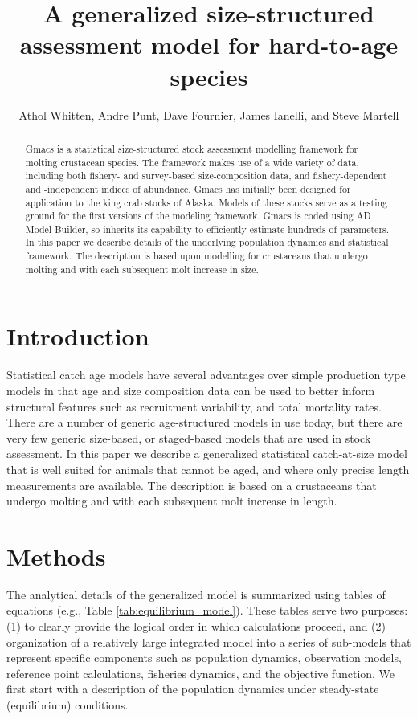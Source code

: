 \documentclass[12pt,letterpaper]{article}
\title{A generalized size-structured assessment model for hard-to-age species}
\author{Athol Whitten, Andre Punt, Dave Fournier, James Ianelli, and Steve Martell}
\begin{document}
  \maketitle

  \begin{abstract}
    Gmacs is a statistical size-structured stock assessment modelling framework for molting crustacean species. The framework makes use of a wide variety of data, including both fishery- and survey-based size-composition data, and fishery-dependent and -independent indices of abundance. Gmacs has initially been designed for application to the king crab stocks of Alaska. Models of these stocks serve as a testing ground for the first versions of the modeling framework. Gmacs is coded using AD Model Builder, so inherits its capability to efficiently estimate hundreds of parameters. In this paper we describe details of the underlying population dynamics and statistical framework. The description is based upon modelling for crustaceans that undergo molting and with each subsequent molt increase in size.

  \end{abstract}


  \section*{Introduction} %
  \label{sec:introduction}

  Statistical catch age models have several advantages over simple production type models in that age and size composition data can be used to better inform structural features such as recruitment variability, and total mortality rates.  There are a number of generic age-structured models in use today, but there are very few generic size-based, or staged-based models that are used in stock assessment. In this paper we describe a generalized statistical catch-at-size model that is well suited for animals that cannot be aged, and where only precise length measurements are available. The description is based on a crustaceans that undergo molting and with each subsequent molt increase in length.


  \section*{Methods} %
  \label{sec:methods}
  The analytical details of the generalized model is summarized using tables of equations (e.g., Table \ref{tab:equilibrium_model}).   These tables serve two purposes: (1) to clearly provide the logical order in which calculations proceed, and (2) organization of a relatively large integrated model into a series of sub-models that represent specific components such as population dynamics, observation models, reference point calculations, fisheries dynamics, and the objective function.  We first start with a description of the population dynamics under steady-state (equilibrium) conditions.  
\end{document}
